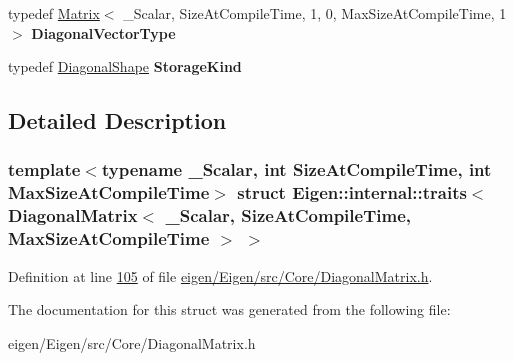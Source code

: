 \begin{DoxyCompactItemize}
typedef \hyperlink{group___core___module_class_eigen_1_1_matrix}{Matrix}$<$ \+\_\+\+Scalar, Size\+At\+Compile\+Time, 1, 0, Max\+Size\+At\+Compile\+Time, 1 $>$ {\bfseries Diagonal\+Vector\+Type}
\item 
\mbox{\label{struct_eigen_1_1internal_1_1traits_3_01_diagonal_matrix_3_01___scalar_00_01_size_at_compile_timeb0b2868b66e3b20cd28c00acb4409967_a2225b46d111387e4395222c9ad6dccdc}} 
typedef \hyperlink{struct_eigen_1_1_diagonal_shape}{Diagonal\+Shape} {\bfseries Storage\+Kind}
\end{DoxyCompactItemize}


\subsection{Detailed Description}
\subsubsection*{template$<$typename \+\_\+\+Scalar, int Size\+At\+Compile\+Time, int Max\+Size\+At\+Compile\+Time$>$\newline
struct Eigen\+::internal\+::traits$<$ Diagonal\+Matrix$<$ \+\_\+\+Scalar, Size\+At\+Compile\+Time, Max\+Size\+At\+Compile\+Time $>$ $>$}



Definition at line \hyperlink{eigen_2_eigen_2src_2_core_2_diagonal_matrix_8h_source_l00105}{105} of file \hyperlink{eigen_2_eigen_2src_2_core_2_diagonal_matrix_8h_source}{eigen/\+Eigen/src/\+Core/\+Diagonal\+Matrix.\+h}.



The documentation for this struct was generated from the following file\+:\begin{DoxyCompactItemize}
\item 
eigen/\+Eigen/src/\+Core/\+Diagonal\+Matrix.\+h\end{DoxyCompactItemize}
